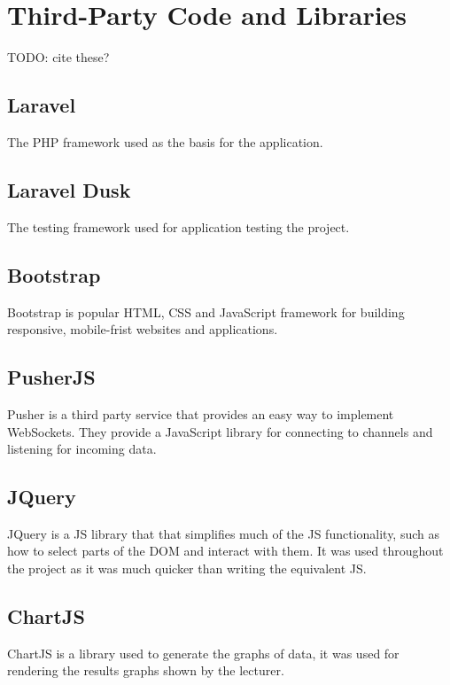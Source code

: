 \chapter{Third-Party Code and Libraries}
TODO: cite these?
\section{Laravel}
The PHP framework used as the basis for the application\cite{laravel}.
\section{Laravel Dusk}
The testing framework used for application testing the project.
\section{Bootstrap}
Bootstrap is popular HTML, CSS and JavaScript framework for building responsive, mobile-frist websites and applications\cite{bootstrap}.
\section{PusherJS}
Pusher is a third party service that provides an easy way to implement WebSockets. They provide a JavaScript library for connecting to channels and listening for incoming data.
\section{JQuery}
JQuery is a JS library that that simplifies much of the JS functionality, such as how to select parts of the DOM and interact with them. It was used throughout the project as it was much quicker than writing the equivalent JS.
\section{ChartJS}
ChartJS is a library used to generate the graphs of data, it was used for rendering the results graphs shown by the lecturer.